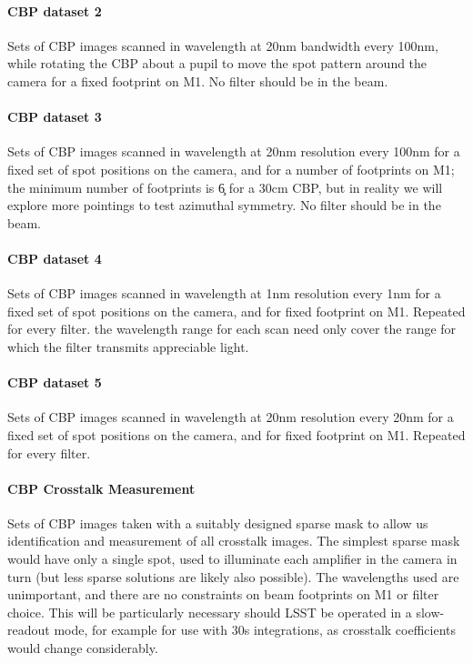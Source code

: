 	
\paragraph{CBP dataset 2}\label{sec:CPP:inputs:CBP:spot}
Sets of CBP images scanned in wavelength at 20nm bandwidth every 100nm, while rotating the CBP about a pupil to move the spot pattern around the camera for a fixed footprint on M1. No filter should be in the beam.

	
\paragraph{CBP dataset 3}\label{sec:CPP:inputs:CBP:M1}
Sets of CBP images scanned in wavelength at 20nm resolution every 100nm for a fixed set of spot positions on the camera, and for a number of footprints on M1; the minimum number of footprints is \c 6 for a 30cm CBP, but in reality we will explore more pointings to test azimuthal symmetry. No filter should be in the beam.


\paragraph{CBP dataset 4}\label{sec:CPP:inputs:CBP:filter}
Sets of CBP images scanned in wavelength at 1nm resolution every 1nm for a fixed set of spot positions on the camera, and for fixed footprint on M1. Repeated for every filter. \Nb the wavelength range for each scan need only cover the range for which the filter transmits appreciable light.


\paragraph{CBP dataset 5}\label{sec:CPP:inputs:CBP:leak}
Sets of CBP images scanned in wavelength at 20nm resolution every 20nm for a fixed set of spot positions on the camera, and for fixed footprint on M1. Repeated for every filter.


\paragraph {CBP Crosstalk Measurement}\label{sec:CPP:inputs:CBP:crosstalk}
Sets of CBP images taken with a suitably designed sparse mask to allow us identification and measurement of all crosstalk images. The simplest sparse mask would have only a single spot, used to illuminate each amplifier in the camera in turn (but less sparse solutions are likely also possible). The wavelengths used are unimportant, and there are no constraints on beam footprints on M1 or filter choice. This will be particularly necessary should LSST be operated in a slow-readout mode, for example for use with 30s integrations, as crosstalk coefficients would change considerably.


